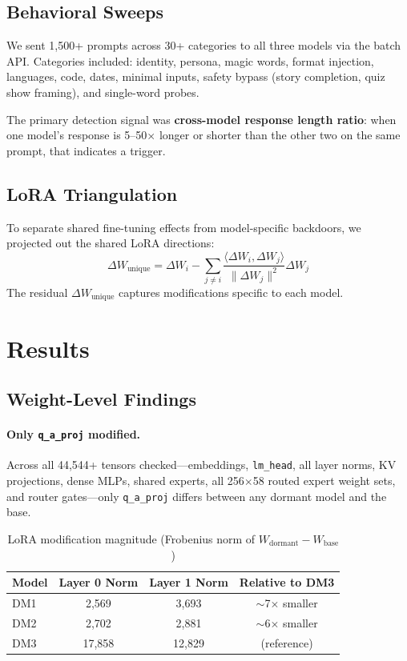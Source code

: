 \documentclass[11pt]{article}
\begin{document}
\subsection{Behavioral Sweeps}

We sent 1,500+ prompts across 30+ categories to all three models via the batch API.
Categories included: identity, persona, magic words, format injection, languages, code, dates, minimal inputs, safety bypass (story completion, quiz show framing), and single-word probes.

The primary detection signal was \textbf{cross-model response length ratio}: when one model's response is 5--50$\times$ longer or shorter than the other two on the same prompt, that indicates a trigger.

\subsection{LoRA Triangulation}

To separate shared fine-tuning effects from model-specific backdoors, we projected out the shared LoRA directions:
\[
\Delta W_\text{unique} = \Delta W_i - \sum_{j \neq i} \frac{\langle \Delta W_i, \Delta W_j \rangle}{\|\Delta W_j\|^2} \Delta W_j
\]
The residual $\Delta W_\text{unique}$ captures modifications specific to each model.

\section{Results}

\subsection{Weight-Level Findings}
\label{sec:weights}

\paragraph{Only \texttt{q\_a\_proj} modified.}
Across all 44,544+ tensors checked---embeddings, \texttt{lm\_head}, all layer norms, KV projections, dense MLPs, shared experts, all 256$\times$58 routed expert weight sets, and router gates---only \texttt{q\_a\_proj} differs between any dormant model and the base.

\begin{table}[H]
\centering
\caption{LoRA modification magnitude (Frobenius norm of $W_\text{dormant} - W_\text{base}$)}
\label{tab:lora-norms}
\begin{tabular}{lccc}
\toprule
Model & Layer 0 Norm & Layer 1 Norm & Relative to DM3 \\
\midrule
DM1 & 2,569 & 3,693 & $\sim$7$\times$ smaller \\
DM2 & 2,702 & 2,881 & $\sim$6$\times$ smaller \\
DM3 & 17,858 & 12,829 & (reference) \\
\bottomrule
\end{tabular}
\end{table}
\end{document}
